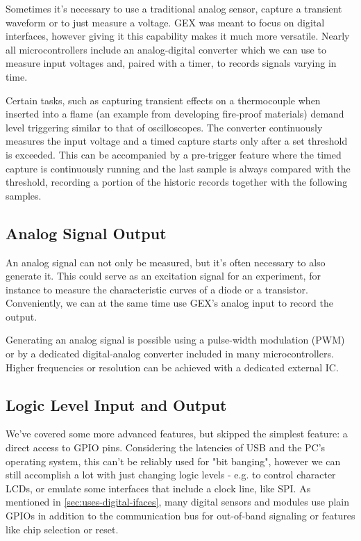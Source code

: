 Sometimes it's necessary to use a traditional analog sensor, capture a transient waveform or to just measure a voltage. GEX was meant to focus on digital interfaces, however giving it this capability makes it much more versatile. Nearly all microcontrollers include an analog-digital converter which we can use to measure input voltages and, paired with a timer, to records signals varying in time.

Certain tasks, such as capturing transient effects on a thermocouple when inserted into a flame (an example from developing fire-proof materials) demand level triggering similar to that of oscilloscopes. The converter continuously measures the input voltage and a timed capture starts only after a set threshold is exceeded. This can be accompanied by a pre-trigger feature where the timed capture is continuously running and the last sample is always compared with the threshold, recording a portion of the historic records together with the following samples.

\subsection{Analog Signal Output}

An analog signal can not only be measured, but it's often necessary to also generate it. This could serve as an excitation signal for an experiment, for instance to measure the characteristic curves of a diode or a transistor. Conveniently, we can at the same time use GEX's analog input to record the output.

Generating an analog signal is possible using a pulse-width modulation (PWM) or by a dedicated digital-analog converter included in many microcontrollers. Higher frequencies or resolution can be achieved with a dedicated external IC.

\subsection{Logic Level Input and Output}

We've covered some more advanced features, but skipped the simplest feature: a direct access to GPIO pins. Considering the latencies of USB and the PC's operating system, this can't be reliably used for "bit banging", however we can still accomplish a lot with just changing logic levels - e.g. to control character LCDs, or emulate some interfaces that include a clock line, like SPI. As mentioned in \ref{sec:uses-digital-ifaces}, many digital sensors and modules use plain GPIOs in addition to the communication bus for out-of-band signaling or features like chip selection or reset.

